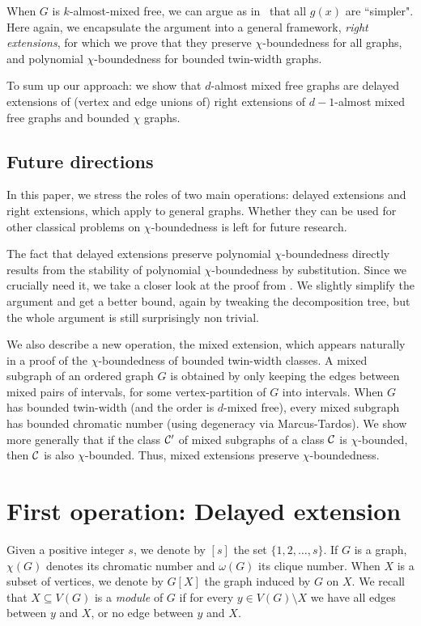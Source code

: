 \documentclass[11pt]{article}
\numberwithin{equation}{section}
\begin{document}
When $G$ is $k$-almost-mixed free, we can argue as in~\cite{PS22} that all $g(x)$ are ``simpler". Here again, we encapsulate the argument into a general framework, \emph{right extensions}, for which we prove that they preserve $\chi$-boundedness for all graphs, and polynomial $\chi$-boundedness for bounded twin-width graphs.

To sum up our approach: we show that $d$-almost mixed free graphs are delayed extensions of (vertex and edge unions of) right extensions of $d-1$-almost mixed free graphs and bounded $\chi$ graphs.

\subsection{Future directions}

In this paper, we stress the roles of two main operations: delayed extensions and right extensions, which apply to general graphs. Whether they can be used for other classical problems on $\chi$-boundedness is left for future research.

The fact that delayed extensions preserve polynomial $\chi$-boundedness directly results from the stability of polynomial $\chi$-boundedness by substitution. Since we crucially need it, we take a closer look at the proof from \cite{CPST13}. We slightly simplify the argument and get a better bound, again by tweaking the decomposition tree, but the whole argument is still surprisingly non trivial.

We also describe a new operation, the mixed extension, which appears naturally in a proof of the $\chi$-boundedness of bounded twin-width classes. A mixed subgraph of an ordered graph $G$ is obtained by only keeping the edges between mixed pairs of intervals, for some vertex-partition of $G$ into intervals. When $G$ has bounded twin-width (and the order is $d$-mixed free), every mixed subgraph has bounded chromatic number (using degeneracy via Marcus-Tardos). We show more generally that if the class $\cal C'$ of mixed subgraphs of a class $\cal C$ is $\chi$-bounded, then $\cal C$ is also $\chi$-bounded. Thus, mixed extensions preserve $\chi$-boundedness.


\section{First operation: Delayed extension}

Given a positive integer $s$, we denote by $[s]$ the set $\{1, 2, \ldots, s\}$. If $G$ is a graph, $\chi(G)$ denotes its chromatic number and $\omega(G)$ its clique number. When $X$ is a subset of vertices, we denote by $G[X]$ the graph induced by $G$ on $X$. We recall that $X\subseteq V(G)$ is a \emph{module} of $G$ if for every $y\in V(G)\setminus X$ we have all edges between $y$ and $X$, or no edge between $y$ and $X$.
\end{document}
